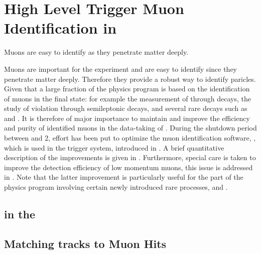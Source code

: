 \chapter{High Level Trigger Muon Identification in \runtwo}
\label{Muon_id_hlt}


Muons are easy to identify as they penetrate matter deeply.


Muons are important for the \lhcb experiment and are easy to identify since they penetrate matter deeply.
Therefore they provide a robust way to identify \jpsi paricles. Given that a large fraction of the \lhcb physics
program is based on the identification of muons in the final state: for example the measurement of \phis through
\BsJpsiPhi decays, the study of \CP violation through semileptonic decays, and several rare decays such as
\BdKstmumu and \Bsmm. It is therefore of major importance to maintain and improve the efficiency and purity of identified muons in
the \runtwo data-taking of \lhcb. During the shutdown period between \runone and 2, effort has been put to
optimize the muon identification software, \muonID, which is used in the \lhcb trigger system, introduced in .
A brief quantitative description of the \muonID improvements is given in .
Furthermore, special care is taken to improve the detection efficiency of low momentum muons, this issue is
addressed in . Note that the latter improvement is particularly useful for the part
of the \lhcb physics program involving certain newly introduced rare processes, \eg \Sigmapmumu \cite{LHCB-CONF-2016-013-001} and \Ksmumu \cite{LHCb-CONF-2016-012}.

\section{\hltone \muonID in the \lhc \runtwo}
\label{muid_hlt1}


\section{Matching \velo tracks to Muon Hits}
\label{mvm_algorrithm}

